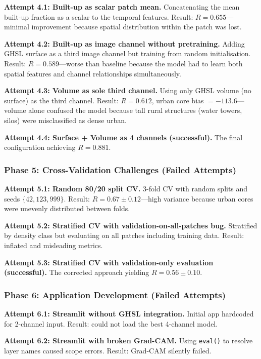 \documentclass[12pt,a4paper]{article}
\begin{document}
\textbf{Attempt 4.1: Built-up as scalar patch mean.} Concatenating the mean built-up fraction as a scalar to the temporal features. Result: $R = 0.655$---minimal improvement because spatial distribution within the patch was lost.

\textbf{Attempt 4.2: Built-up as image channel without pretraining.} Adding GHSL surface as a third image channel but training from random initialisation. Result: $R = 0.589$---worse than baseline because the model had to learn both spatial features and channel relationships simultaneously.

\textbf{Attempt 4.3: Volume as sole third channel.} Using only GHSL volume (no surface) as the third channel. Result: $R = 0.612$, urban core bias $= -113.6$---volume alone confused the model because tall rural structures (water towers, silos) were misclassified as dense urban.

\textbf{Attempt 4.4: Surface + Volume as 4 channels (successful).} The final configuration achieving $R = 0.881$.

\subsubsection{Phase 5: Cross-Validation Challenges (Failed Attempts)}

\textbf{Attempt 5.1: Random 80/20 split CV.} 3-fold CV with random splits and seeds $\{42, 123, 999\}$. Result: $R = 0.67 \pm 0.12$---high variance because urban cores were unevenly distributed between folds.

\textbf{Attempt 5.2: Stratified CV with validation-on-all-patches bug.} Stratified by density class but evaluating on all patches including training data. Result: inflated and misleading metrics.

\textbf{Attempt 5.3: Stratified CV with validation-only evaluation (successful).} The corrected approach yielding $R = 0.56 \pm 0.10$.

\subsubsection{Phase 6: Application Development (Failed Attempts)}

\textbf{Attempt 6.1: Streamlit without GHSL integration.} Initial app hardcoded for 2-channel input. Result: could not load the best 4-channel model.

\textbf{Attempt 6.2: Streamlit with broken Grad-CAM.} Using \texttt{eval()} to resolve layer names caused scope errors. Result: Grad-CAM silently failed.
\end{document}
